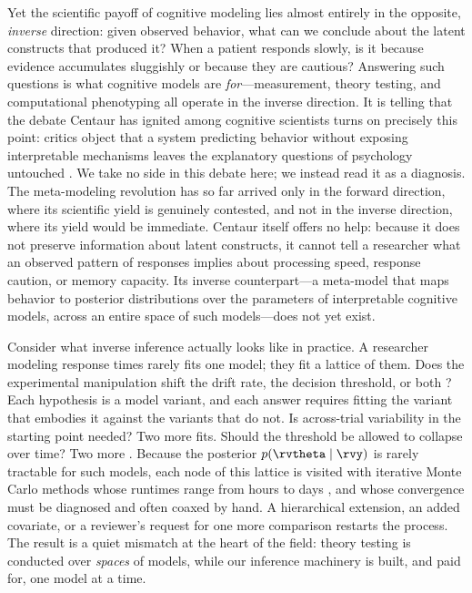 Yet the scientific payoff of cognitive modeling lies almost entirely in the opposite, \textit{inverse} direction: given observed behavior, what can we conclude about the latent constructs that produced it?
When a patient responds slowly, is it because evidence accumulates sluggishly or because they are cautious?
Answering such questions
 is what cognitive models are \textit{for}---measurement, theory testing, and computational phenotyping all operate in the inverse direction.
It is telling that the debate Centaur has ignited among cognitive scientists turns on precisely this point: critics object that a system predicting behavior without exposing interpretable mechanisms leaves the explanatory questions of psychology untouched \citep{PLACEHOLDER-centaur-critiques}.
We take no side in this debate here; we instead read it as a diagnosis.
The meta-modeling revolution has so far arrived only in the forward direction, where its scientific yield is genuinely contested, and not in the inverse direction, where its yield would be immediate.
Centaur itself offers no help: because it does not preserve information about latent constructs, it cannot tell a researcher what an observed pattern of responses implies about processing speed, response caution, or memory capacity.
Its inverse counterpart---a meta-model that maps behavior to posterior distributions over the parameters of interpretable cognitive models, across an entire space of such models---does not yet exist.

Consider what inverse inference actually looks like in practice.
A researcher modeling response times rarely fits one model; they fit a lattice of them.
Does the experimental manipulation shift the drift rate, the decision threshold, or both \citep{voss2019sequential, von2022mental}?
Each hypothesis is a model variant, and each answer requires fitting the variant that embodies it against the variants that do not.
Is across-trial variability in the starting point needed?
Two more fits.
Should the threshold be allowed to collapse over time?
Two more \citep{evans2019assessing}.
Because the posterior $p(\rvtheta \mid \rvy)$ is rarely tractable for such models, each node of this lattice is visited with iterative Monte Carlo methods whose runtimes range from hours to days \citep{stricklandRacingRemember2018, mileticParameterRecovery2017}, and whose convergence must be diagnosed and often coaxed by hand.
A hierarchical extension, an added covariate, or a reviewer's request for one more comparison restarts the process.
The result is a quiet mismatch at the heart of the field: theory testing is conducted over \textit{spaces} of models, while our inference machinery is built, and paid for, one model at a time.

